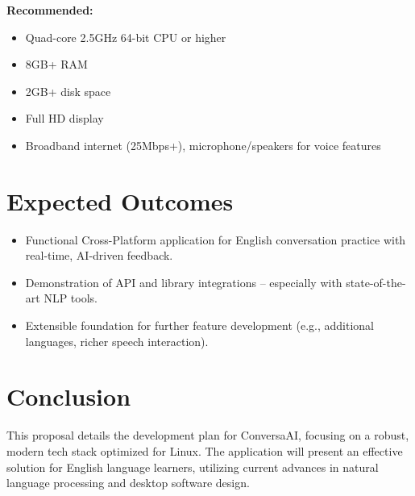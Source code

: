 \documentclass[12pt]{article}
\begin{document}
\noindent \textbf{Recommended:}
\begin{itemize}
    \item Quad-core 2.5GHz 64-bit CPU or higher
    \item 8GB+ RAM
    \item 2GB+ disk space
    \item Full HD display
    \item Broadband internet (25Mbps+), microphone/speakers for voice features
\end{itemize}

\section*{Expected Outcomes}

\begin{itemize}
    \item Functional Cross-Platform application for English conversation practice with real-time, AI-driven feedback.
    \item Demonstration of API and library integrations -- especially with state-of-the-art NLP tools.
    \item Extensible foundation for further feature development (e.g., additional languages, richer speech interaction).
\end{itemize}

\section*{Conclusion}

This proposal details the development plan for ConversaAI, focusing on a robust, modern tech stack optimized for Linux. The application will present an effective solution for English language learners, utilizing current advances in natural language processing and desktop software design.
\end{document}
